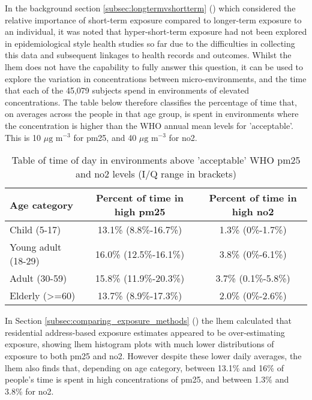 In the background section \ref{subsec:longtermvshortterm} () which considered the relative importance of short-term exposure compared to longer-term exposure to an individual, it was noted that hyper-short-term exposure had not been explored in epidemiological style health studies so far due to the difficulties in collecting this data and subsequent linkages to health records and outcomes. Whilst the \gls{lhem} does not have the capability to fully answer this question, it can be used to explore the variation in concentrations between micro-environments, and the time that each of the 45,079 subjects spend in environments of elevated concentrations. The table below therefore classifies the percentage of time that, on averages across the people in that age group, is spent in environments where the concentration is higher than the WHO annual mean levels for 'acceptable'. This is 10 $\mu \text{g m}^{-3}$ for \gls{pm25}, and 40 $\mu \text{g m}^{-3}$ for \gls{no2}.

\begin{table}[H]
\caption{Table of time of day in environments above 'acceptable' WHO \gls{pm25} and \gls{no2} levels (I/Q range in brackets)}
\centering
    \begin{tabular}{ | l | c | c | }
    \hline 
     Age category & Percent of time in high \gls{pm25} & Percent of time in high \gls{no2} \\ \hline
     Child (5-17) & 13.1\% (8.8\%-16.7\%) & 1.3\% (0\%-1.7\%) \\ \hline
     Young adult (18-29) & 16.0\% (12.5\%-16.1\%) & 3.8\% (0\%-6.1\%) \\ \hline
     Adult (30-59) & 15.8\% (11.9\%-20.3\%) & 3.7\% (0.1\%-5.8\%) \\ \hline
     Elderly (\textgreater=60) & 13.7\% (8.9\%-17.3\%) & 2.0\% (0\%-2.6\%) \\ \hline
    \end{tabular}
\label{tab:people_time_above}
\end{table}

In Section \ref{subsec:comparing_exposure_methods} () the \gls{lhem} calculated that residential address-based exposure estimates appeared to be over-estimating exposure, showing \gls{lhem} histogram plots with much lower distributions of exposure to both \gls{pm25} and \gls{no2}. However despite these lower daily averages, the \gls{lhem} also finds that, depending on age category, between 13.1\% and 16\% of people's time is spent in high concentrations of \gls{pm25}, and between 1.3\% and 3.8\% for \gls{no2}.

